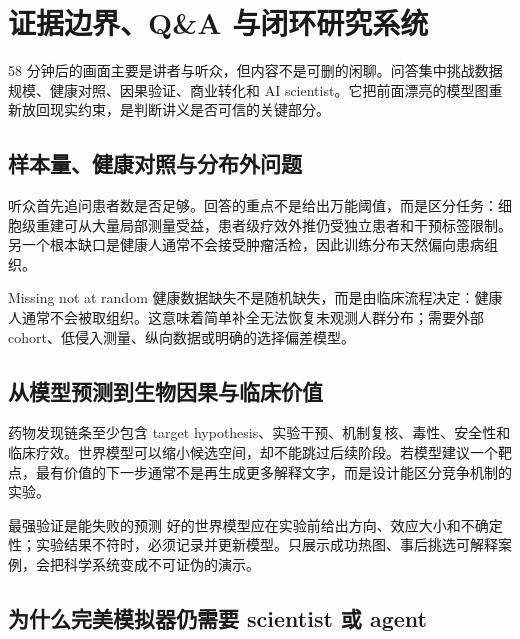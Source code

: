 \section{证据边界、Q\&A 与闭环研究系统}

58 分钟后的画面主要是讲者与听众，但内容不是可删的闲聊。问答集中挑战数据规模、健康对照、因果验证、商业转化和 AI scientist。它把前面漂亮的模型图重新放回现实约束，是判断讲义是否可信的关键部分。

\subsection{样本量、健康对照与分布外问题}

听众首先追问患者数是否足够。回答的重点不是给出万能阈值，而是区分任务：细胞级重建可从大量局部测量受益，患者级疗效外推仍受独立患者和干预标签限制。另一个根本缺口是健康人通常不会接受肿瘤活检，因此训练分布天然偏向患病组织。


\begin{warningbox}{Missing not at random}
健康数据缺失不是随机缺失，而是由临床流程决定：健康人通常不会被取组织。这意味着简单补全无法恢复未观测人群分布；需要外部 cohort、低侵入测量、纵向数据或明确的选择偏差模型。
\end{warningbox}

\subsection{从模型预测到生物因果与临床价值}

药物发现链条至少包含 target hypothesis、实验干预、机制复核、毒性、安全性和临床疗效。世界模型可以缩小候选空间，却不能跳过后续阶段。若模型建议一个靶点，最有价值的下一步通常不是再生成更多解释文字，而是设计能区分竞争机制的实验。


\begin{importantbox}{最强验证是能失败的预测}
好的世界模型应在实验前给出方向、效应大小和不确定性；实验结果不符时，必须记录并更新模型。只展示成功热图、事后挑选可解释案例，会把科学系统变成不可证伪的演示。
\end{importantbox}

\subsection{为什么完美模拟器仍需要 scientist 或 agent}

